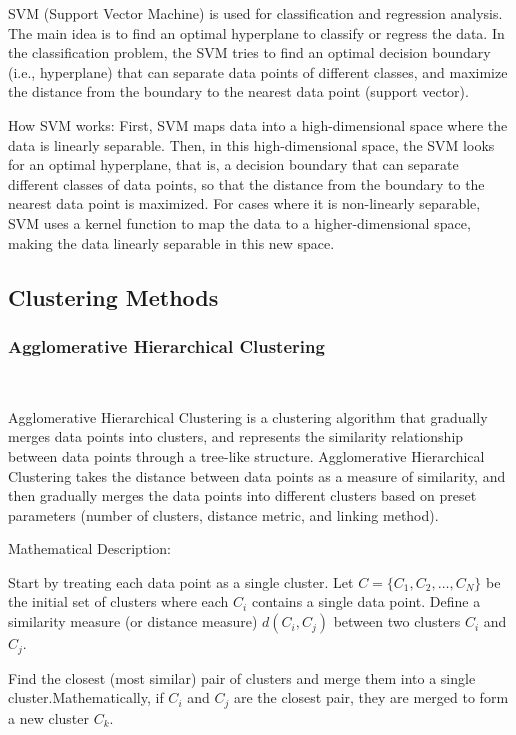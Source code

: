 \documentclass[conference]{IEEEtran}
\begin{document}
	SVM (Support Vector Machine) is used for classification and regression analysis. The main idea is to find an optimal hyperplane to classify or regress the data. In the classification problem, the SVM tries to find an optimal decision boundary (i.e., hyperplane) that can separate data points of different classes, and maximize the distance from the boundary to the nearest data point (support vector).
	
	How SVM works: First, SVM maps data into a high-dimensional space where the data is linearly separable. Then, in this high-dimensional space, the SVM looks for an optimal hyperplane, that is, a decision boundary that can separate different classes of data points, so that the distance from the boundary to the nearest data point is maximized. For cases where it is non-linearly separable, SVM uses a kernel function to map the data to a higher-dimensional space, making the data linearly separable in this new space.
	
	\subsection{Clustering Methods}
	\subsubsection{Agglomerative Hierarchical Clustering} \
	
	Agglomerative Hierarchical Clustering\cite{b4} is a clustering algorithm that gradually merges data points into clusters, and represents the similarity relationship between data points through a tree-like structure. Agglomerative Hierarchical Clustering takes the distance between data points as a measure of similarity, and then gradually merges the data points into different clusters based on preset parameters (number of clusters, distance metric, and linking method).
	
	Mathematical Description:
	
	Start by treating each data point as a single cluster. Let $C = \{C_1, C_2, \ldots, C_N\}$ be the initial set of clusters where each $C_i$ contains a single data point. Define a similarity measure (or distance measure) $d(C_i, C_j)$ between two clusters $C_i$ and $C_j$.
	
	Find the closest (most similar) pair of clusters and merge them into a single cluster.Mathematically, if $C_i$ and $C_j$ are the closest pair, they are merged to form a new cluster $C_k$.
	
\end{document}
